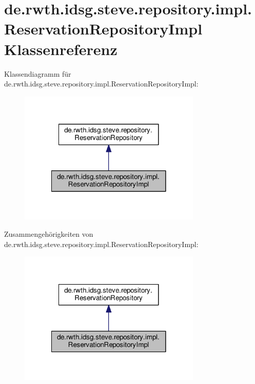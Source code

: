 \hypertarget{classde_1_1rwth_1_1idsg_1_1steve_1_1repository_1_1impl_1_1_reservation_repository_impl}{\section{de.\-rwth.\-idsg.\-steve.\-repository.\-impl.\-Reservation\-Repository\-Impl Klassenreferenz}
\label{classde_1_1rwth_1_1idsg_1_1steve_1_1repository_1_1impl_1_1_reservation_repository_impl}
}


Klassendiagramm für de.\-rwth.\-idsg.\-steve.\-repository.\-impl.\-Reservation\-Repository\-Impl\-:\nopagebreak
\begin{figure}[H]
\begin{center}
\leavevmode
\includegraphics[width=246pt]{classde_1_1rwth_1_1idsg_1_1steve_1_1repository_1_1impl_1_1_reservation_repository_impl__inherit__graph}
\end{center}
\end{figure}


Zusammengehörigkeiten von de.\-rwth.\-idsg.\-steve.\-repository.\-impl.\-Reservation\-Repository\-Impl\-:\nopagebreak
\begin{figure}[H]
\begin{center}
\leavevmode
\includegraphics[width=246pt]{classde_1_1rwth_1_1idsg_1_1steve_1_1repository_1_1impl_1_1_reservation_repository_impl__coll__graph}
\end{center}
\end{figure}
